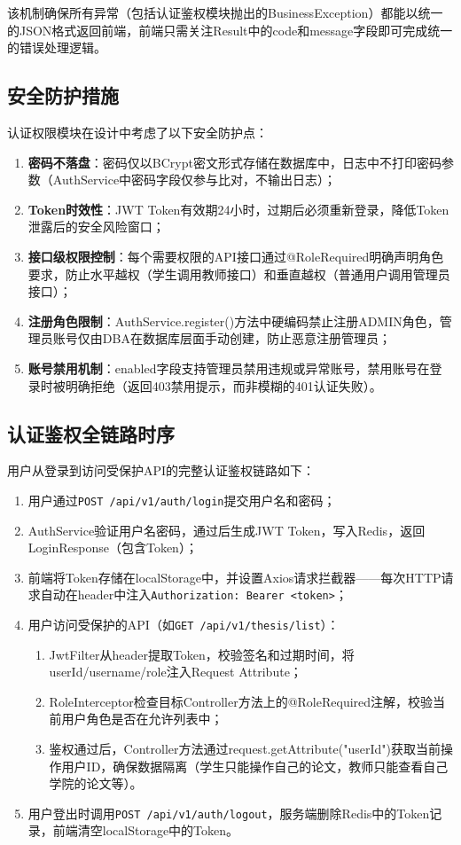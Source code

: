 \documentclass{../../softeng}
\begin{document}
该机制确保所有异常（包括认证鉴权模块抛出的BusinessException）都能以统一的JSON格式返回前端，前端只需关注Result中的code和message字段即可完成统一的错误处理逻辑。

\subsection{安全防护措施}

认证权限模块在设计中考虑了以下安全防护点：

\begin{enumerate}
    \item \textbf{密码不落盘}：密码仅以BCrypt密文形式存储在数据库中，日志中不打印密码参数（AuthService中密码字段仅参与比对，不输出日志）；
    \item \textbf{Token时效性}：JWT Token有效期24小时，过期后必须重新登录，降低Token泄露后的安全风险窗口；
    \item \textbf{接口级权限控制}：每个需要权限的API接口通过@RoleRequired明确声明角色要求，防止水平越权（学生调用教师接口）和垂直越权（普通用户调用管理员接口）；
    \item \textbf{注册角色限制}：AuthService.register()方法中硬编码禁止注册ADMIN角色，管理员账号仅由DBA在数据库层面手动创建，防止恶意注册管理员；
    \item \textbf{账号禁用机制}：enabled字段支持管理员禁用违规或异常账号，禁用账号在登录时被明确拒绝（返回403禁用提示，而非模糊的401认证失败）。
\end{enumerate}

\subsection{认证鉴权全链路时序}

用户从登录到访问受保护API的完整认证鉴权链路如下：

\begin{enumerate}
    \item 用户通过\verb|POST /api/v1/auth/login|提交用户名和密码；
    \item AuthService验证用户名密码，通过后生成JWT Token，写入Redis，返回LoginResponse（包含Token）；
    \item 前端将Token存储在localStorage中，并设置Axios请求拦截器——每次HTTP请求自动在header中注入\verb|Authorization: Bearer <token>|；
    \item 用户访问受保护的API（如\verb|GET /api/v1/thesis/list|）：
    \begin{enumerate}
        \item[(a)] JwtFilter从header提取Token，校验签名和过期时间，将userId/username/role注入Request Attribute；
        \item[(b)] RoleInterceptor检查目标Controller方法上的@RoleRequired注解，校验当前用户角色是否在允许列表中；
        \item[(c)] 鉴权通过后，Controller方法通过request.getAttribute("userId")获取当前操作用户ID，确保数据隔离（学生只能操作自己的论文，教师只能查看自己学院的论文等）。
    \end{enumerate}
    \item 用户登出时调用\verb|POST /api/v1/auth/logout|，服务端删除Redis中的Token记录，前端清空localStorage中的Token。
\end{enumerate}
\end{document}
